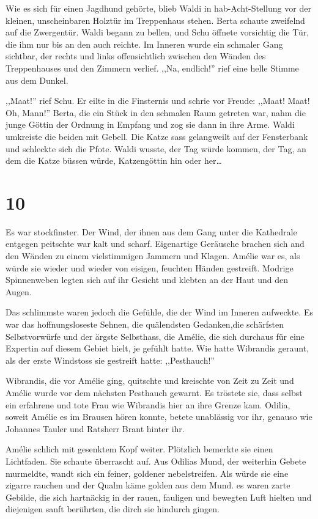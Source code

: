 Wie es sich für einen Jagdhund gehörte, blieb Waldi in hab-Acht-Stellung vor der kleinen, unscheinbaren Holztür im Treppenhaus stehen. Berta schaute zweifelnd auf die Zwergentür. Waldi begann zu bellen, und Schu öffnete vorsichtig die Tür, die ihm nur bis an den auch reichte. Im Inneren wurde ein schmaler Gang sichtbar, der rechts und links offensichtlich zwischen den Wänden des Treppenhauses und den Zimmern verlief. ,,Na, endlich!'' rief eine helle Stimme aus dem Dunkel.

,,Maat!'' rief Schu. Er eilte in die Finsternis und schrie vor Freude: ,,Maat! Maat! Oh, Mann!'' Berta, die ein Stück in den schmalen Raum getreten war, nahm die junge Göttin der Ordnung in Empfang und zog sie dann in ihre Arme. Waldi umkreiste die beiden mit Gebell. Die Katze sass gelangweilt auf der Fensterbank und schleckte sich die Pfote. Waldi wusste, der Tag würde kommen, der Tag, an dem die Katze büssen würde, Katzengöttin hin oder her\dots


\section*{10}

Es war stockfinster. Der Wind, der ihnen aus dem Gang unter die Kathedrale entgegen peitschte war kalt und scharf. Eigenartige Geräusche brachen sich and den Wänden zu einem vielstimmigen Jammern und Klagen. Amélie war es, als würde sie wieder und wieder von eisigen, feuchten Händen gestreift. Modrige Spinnenweben legten sich auf ihr Gesicht und klebten an der Haut und den Augen. 

Das schlimmste waren jedoch die Gefühle, die der Wind im Inneren aufweckte. Es war das hoffnungsloseste Sehnen, die quälendsten Gedanken,die schärfsten Selbstvorwürfe und der ärgste Selbsthass, die Amélie, die sich durchaus für eine Expertin auf diesem Gebiet hielt, je gefühlt hatte. Wie hatte Wibrandis geraunt, als der erste Windstoss sie gestreift hatte: ,,Pesthauch!'' 

Wibrandis, die vor Amélie ging, quitschte und kreischte von Zeit zu Zeit und Amélie wurde vor dem nächsten Pesthauch gewarnt. Es tröstete sie, dass selbst ein erfahrene und tote Frau wie Wibrandis hier an ihre Grenze kam. Odilia, soweit Amélie es im Brausen hören konnte, betete unablässig vor ihr, genauso wie Johannes Tauler und Ratsherr Brant hinter ihr.

Amélie schlich mit gesenktem Kopf weiter. Plötzlich bemerkte sie einen Lichtfaden. Sie schaute überrascht auf. Aus Odilias Mund, der weiterhin Gebete murmeldte, wandt sich ein feiner, goldener nebelstreifen. Als würde sie eine zigarre rauchen und der Qualm käme golden aus dem Mund. es waren zarte Gebilde, die sich hartnäckig in der rauen, fauligen und bewegten Luft hielten und diejenigen sanft berührten, die dirch sie hindurch gingen.

